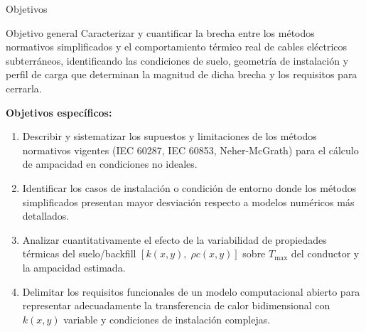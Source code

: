 \documentclass[aspectratio=169]{beamer}
\begin{document}
\begin{frame}{Objetivos}

\begin{block}{Objetivo general}
\justifying\small
Caracterizar y cuantificar la brecha entre los métodos normativos
simplificados y el comportamiento térmico real de cables eléctricos
subterráneos, identificando las condiciones de suelo, geometría de
instalación y perfil de carga que determinan la magnitud de dicha
brecha y los requisitos para cerrarla.
\end{block}

\vspace{0.5em}
\textbf{Objetivos específicos:}
\begin{enumerate}[leftmargin=*]\small
    \item Describir y sistematizar los supuestos y limitaciones de los
          métodos normativos vigentes (IEC 60287, IEC 60853, Neher-McGrath)
          para el cálculo de ampacidad en condiciones no ideales.
    \item Identificar los casos de instalación o condición de entorno donde
          los métodos simplificados presentan mayor desviación respecto a
          modelos numéricos más detallados.
    \item Analizar cuantitativamente el efecto de la variabilidad de
          propiedades térmicas del suelo/backfill $[k(x,y),\;\rho c(x,y)]$
          sobre $T_{\max}$ del conductor y la ampacidad estimada.
    \item Delimitar los requisitos funcionales de un modelo computacional
          abierto para representar adecuadamente la transferencia de calor
          bidimensional con $k(x,y)$ variable y condiciones de instalación
          complejas.
\end{enumerate}
\end{frame}
\end{document}
